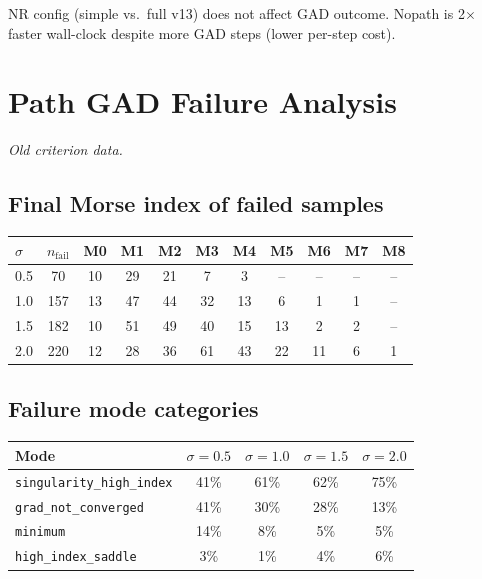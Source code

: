 \documentclass[11pt,a4paper]{article}
\begin{document}
NR config (simple vs.\ full v13) does not affect GAD outcome.
Nopath is 2$\times$ faster wall-clock despite more GAD steps (lower per-step cost).

\section{Path GAD Failure Analysis}
\label{app:path-failures}

\textit{Old criterion data.}

\subsection{Final Morse index of failed samples}

\begin{center}
\begin{tabular}{lcccccccccc}
\toprule
$\sigma$ & $n_\text{fail}$ & M0 & M1 & M2 & M3 & M4 & M5 & M6 & M7 & M8 \\
\midrule
0.5 & 70  & 10 & 29 & 21 & 7  & 3  & -- & -- & -- & -- \\
1.0 & 157 & 13 & 47 & 44 & 32 & 13 & 6  & 1  & 1  & -- \\
1.5 & 182 & 10 & 51 & 49 & 40 & 15 & 13 & 2  & 2  & -- \\
2.0 & 220 & 12 & 28 & 36 & 61 & 43 & 22 & 11 & 6  & 1 \\
\bottomrule
\end{tabular}
\end{center}

\subsection{Failure mode categories}

\begin{center}
\begin{tabular}{lcccc}
\toprule
Mode & $\sigma=0.5$ & $\sigma=1.0$ & $\sigma=1.5$ & $\sigma=2.0$ \\
\midrule
\texttt{singularity\_high\_index} & 41\% & 61\% & 62\% & 75\% \\
\texttt{grad\_not\_converged}     & 41\% & 30\% & 28\% & 13\% \\
\texttt{minimum}                  & 14\% & 8\%  & 5\%  & 5\% \\
\texttt{high\_index\_saddle}      & 3\%  & 1\%  & 4\%  & 6\% \\
\bottomrule
\end{tabular}
\end{center}
\end{document}
